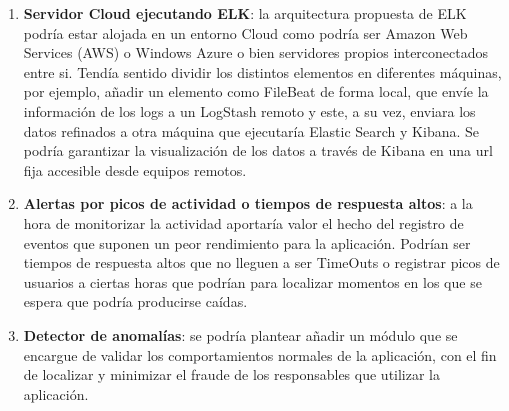 \begin{enumerate}
\item \textbf{Servidor Cloud ejecutando ELK}: la arquitectura propuesta de ELK podría estar alojada en un entorno Cloud como podría ser Amazon Web Services (AWS) o Windows Azure o bien servidores propios interconectados entre si. Tendía sentido dividir los distintos elementos en diferentes máquinas, por ejemplo, añadir un elemento como FileBeat de forma local, que envíe la información de los logs a un LogStash remoto y este, a su vez, enviara los datos refinados a otra máquina que ejecutaría Elastic Search y Kibana. Se podría garantizar la visualización de los datos a través de Kibana en una url fija accesible desde equipos remotos.
\item \textbf{Alertas por picos de actividad o tiempos de respuesta altos}: a la hora de monitorizar la actividad aportaría valor el hecho del registro de eventos que suponen un peor rendimiento para la aplicación. Podrían ser tiempos de respuesta altos que no lleguen a ser TimeOuts o registrar picos de usuarios a ciertas horas que podrían para localizar momentos en los que se espera que podría producirse caídas.
\item \textbf{Detector de anomalías}: se podría plantear añadir un módulo que se encargue de validar los comportamientos normales de la aplicación, con el fin de localizar y minimizar el fraude de los responsables que utilizar la aplicación. 
\end{enumerate}

